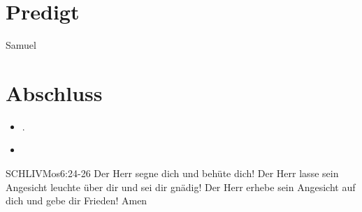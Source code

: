 \documentclass[fontsize=16pt]{mybib}
\newcommand{\Name}{Samuel}
\begin{document}
\section{Predigt}
    \Name
\section{Abschluss}
\begin{itemize}
    \item {}.
    \item {}
\end{itemize}
\begin{bibelbox}{SCHL}{IVMos}{6:24-26}
    Der Herr segne dich und behüte dich!
    Der Herr lasse sein Angesicht leuchte über dir 
    und sei dir gnädig!
    Der Herr erhebe sein Angesicht auf dich
    und gebe dir Frieden! Amen
\end{bibelbox}
\end{document}
